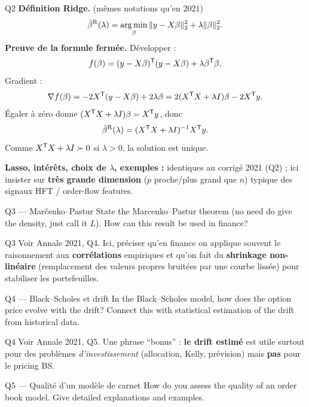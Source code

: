 \begin{solutionbox}{Q2}
\textbf{Définition Ridge.} (mêmes notations qu'en 2021)
\[
\hat\beta^{\mathrm{R}}(\lambda)=\mathop{\mathrm{arg\,min}}_\beta \|y-X\beta\|_2^2+\lambda\|\beta\|_2^2.
\]
\textbf{Preuve de la formule fermée.} Développer :
\[
f(\beta)= (y-X\beta)^{\mathsf{T}}(y-X\beta)+\lambda\beta^{\mathsf{T}}\beta.
\]
Gradient :
\[
\nabla f(\beta) = -2X^{\mathsf{T}}(y-X\beta)+2\lambda\beta = 2(X^{\mathsf{T}} X+\lambda I)\beta -2X^{\mathsf{T}} y.
\]
Égaler à zéro donne $(X^{\mathsf{T}} X+\lambda I)\beta=X^{\mathsf{T}} y$, donc
\[
\hat\beta^{\mathrm{R}}(\lambda)=(X^{\mathsf{T}} X+\lambda I)^{-1}X^{\mathsf{T}} y.
\]
Comme $X^{\mathsf{T}} X+\lambda I \succ 0$ si $\lambda>0$, la solution est unique.

\medskip
\textbf{Lasso, intérêts, choix de $\lambda$, exemples :} identiques au corrigé 2021 (Q2) ; ici insister sur \textbf{très grande dimension} ($p$ proche/plus grand que $n$) typique des signaux HFT / order-flow features.
\end{solutionbox}

\begin{questionbox}{Q3 --- Mar\v{c}enko--Pastur}
State the Marcenko--Pastur theorem (no need do give the density, just call it $L$). How can this result be used in finance?
\end{questionbox}

\begin{solutionbox}{Q3}
Voir Annale 2021, Q4. Ici, préciser qu'en finance on applique souvent le raisonnement aux \textbf{corrélations} empiriques et qu'on fait du \textbf{shrinkage non-linéaire} (remplacement des valeurs propres bruitées par une courbe lissée) pour stabiliser les portefeuilles.
\end{solutionbox}

\begin{questionbox}{Q4 --- Black--Scholes et drift}
In the Black--Scholes model, how does the option price evolve with the drift? Connect this with statistical estimation of the drift from historical data.
\end{questionbox}

\begin{solutionbox}{Q4}
Voir Annale 2021, Q5. Une phrase ``bonus'' : \textbf{le drift estimé} est utile surtout pour des problèmes \emph{d'investissement} (allocation, Kelly, prévision) mais \textbf{pas} pour le pricing BS.
\end{solutionbox}

\begin{questionbox}{Q5 --- Qualité d'un modèle de carnet}
How do you assess the quality of an order book model. Give detailed explanations and examples.
\end{questionbox}


